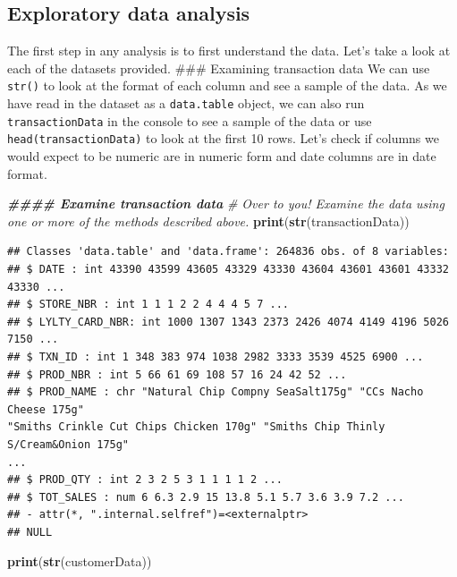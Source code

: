 \documentclass[
]{article}
\newenvironment{Shaded}{\begin{snugshade}}{\end{snugshade}}
\newcommand{\CommentTok}[1]{\textcolor[rgb]{0.56,0.35,0.01}{\textit{#1}}}
\newcommand{\DocumentationTok}[1]{\textcolor[rgb]{0.56,0.35,0.01}{\textbf{\textit{#1}}}}
\newcommand{\FunctionTok}[1]{\textcolor[rgb]{0.13,0.29,0.53}{\textbf{#1}}}
\newcommand{\NormalTok}[1]{#1}
\begin{document}
\subsection{Exploratory data analysis}\label{exploratory-data-analysis}

The first step in any analysis is to first understand the data. Let's
take a look at each of the datasets provided. \#\#\# Examining
transaction data We can use \texttt{str()} to look at the format of each
column and see a sample of the data. As we have read in the dataset as a
\texttt{data.table} object, we can also run \texttt{transactionData} in
the console to see a sample of the data or use
\texttt{head(transactionData)} to look at the first 10 rows. Let's check
if columns we would expect to be numeric are in numeric form and date
columns are in date format.

\begin{Shaded}
\begin{Highlighting}[]
\DocumentationTok{\#\#\#\# Examine transaction data}
\CommentTok{\# Over to you! Examine the data using one or more of the methods described above.}
\FunctionTok{print}\NormalTok{(}\FunctionTok{str}\NormalTok{(transactionData))}
\end{Highlighting}
\end{Shaded}

\begin{verbatim}
## Classes 'data.table' and 'data.frame': 264836 obs. of 8 variables:
## $ DATE : int 43390 43599 43605 43329 43330 43604 43601 43601 43332 43330 ...
## $ STORE_NBR : int 1 1 1 2 2 4 4 4 5 7 ...
## $ LYLTY_CARD_NBR: int 1000 1307 1343 2373 2426 4074 4149 4196 5026 7150 ...
## $ TXN_ID : int 1 348 383 974 1038 2982 3333 3539 4525 6900 ...
## $ PROD_NBR : int 5 66 61 69 108 57 16 24 42 52 ...
## $ PROD_NAME : chr "Natural Chip Compny SeaSalt175g" "CCs Nacho Cheese 175g"
"Smiths Crinkle Cut Chips Chicken 170g" "Smiths Chip Thinly S/Cream&Onion 175g"
...
## $ PROD_QTY : int 2 3 2 5 3 1 1 1 1 2 ...
## $ TOT_SALES : num 6 6.3 2.9 15 13.8 5.1 5.7 3.6 3.9 7.2 ...
## - attr(*, ".internal.selfref")=<externalptr>
## NULL
\end{verbatim}

\begin{Shaded}
\begin{Highlighting}[]
\FunctionTok{print}\NormalTok{(}\FunctionTok{str}\NormalTok{(customerData))}
\end{Highlighting}
\end{Shaded}
\end{document}
